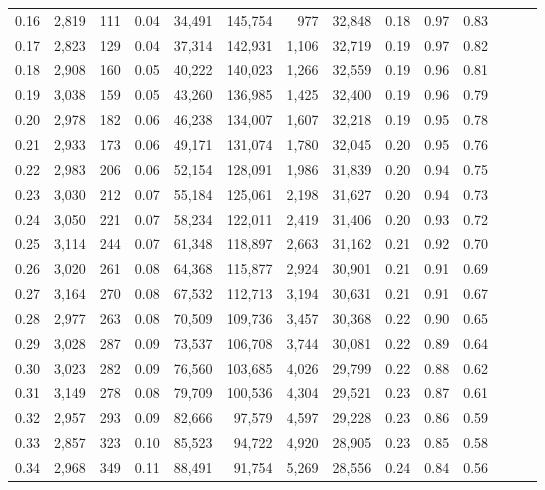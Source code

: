 \begin{tabular}{rrrrrrrrrrrrrr}
0.16 &  2,819 &  111 &  0.04 &   34,491 &  145,754 &     977 &  32,848 &  0.18 &  0.97 &      0.83 \\
0.17 &  2,823 &  129 &  0.04 &   37,314 &  142,931 &   1,106 &  32,719 &  0.19 &  0.97 &      0.82 \\
0.18 &  2,908 &  160 &  0.05 &   40,222 &  140,023 &   1,266 &  32,559 &  0.19 &  0.96 &      0.81 \\
0.19 &  3,038 &  159 &  0.05 &   43,260 &  136,985 &   1,425 &  32,400 &  0.19 &  0.96 &      0.79 \\
0.20 &  2,978 &  182 &  0.06 &   46,238 &  134,007 &   1,607 &  32,218 &  0.19 &  0.95 &      0.78 \\
0.21 &  2,933 &  173 &  0.06 &   49,171 &  131,074 &   1,780 &  32,045 &  0.20 &  0.95 &      0.76 \\
0.22 &  2,983 &  206 &  0.06 &   52,154 &  128,091 &   1,986 &  31,839 &  0.20 &  0.94 &      0.75 \\
0.23 &  3,030 &  212 &  0.07 &   55,184 &  125,061 &   2,198 &  31,627 &  0.20 &  0.94 &      0.73 \\
0.24 &  3,050 &  221 &  0.07 &   58,234 &  122,011 &   2,419 &  31,406 &  0.20 &  0.93 &      0.72 \\
0.25 &  3,114 &  244 &  0.07 &   61,348 &  118,897 &   2,663 &  31,162 &  0.21 &  0.92 &      0.70 \\
0.26 &  3,020 &  261 &  0.08 &   64,368 &  115,877 &   2,924 &  30,901 &  0.21 &  0.91 &      0.69 \\
0.27 &  3,164 &  270 &  0.08 &   67,532 &  112,713 &   3,194 &  30,631 &  0.21 &  0.91 &      0.67 \\
0.28 &  2,977 &  263 &  0.08 &   70,509 &  109,736 &   3,457 &  30,368 &  0.22 &  0.90 &      0.65 \\
0.29 &  3,028 &  287 &  0.09 &   73,537 &  106,708 &   3,744 &  30,081 &  0.22 &  0.89 &      0.64 \\
0.30 &  3,023 &  282 &  0.09 &   76,560 &  103,685 &   4,026 &  29,799 &  0.22 &  0.88 &      0.62 \\
0.31 &  3,149 &  278 &  0.08 &   79,709 &  100,536 &   4,304 &  29,521 &  0.23 &  0.87 &      0.61 \\
0.32 &  2,957 &  293 &  0.09 &   82,666 &   97,579 &   4,597 &  29,228 &  0.23 &  0.86 &      0.59 \\
0.33 &  2,857 &  323 &  0.10 &   85,523 &   94,722 &   4,920 &  28,905 &  0.23 &  0.85 &      0.58 \\
0.34 &  2,968 &  349 &  0.11 &   88,491 &   91,754 &   5,269 &  28,556 &  0.24 &  0.84 &      0.56 \\

\end{tabular}
